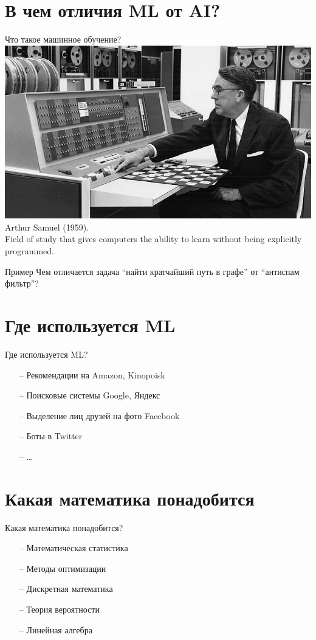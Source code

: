 \documentclass[10pt]{beamer}
\begin{document}
\section{В чем отличия ML от AI?}

\begin{frame}{Что такое машинное обучение?}
  \includegraphics[width=0.5 \linewidth, height=0.5 \textheight, keepaspectratio]{images/samuel}\\
	Arthur Samuel (1959). \\
	\bigbreak
	Field of study that gives computers the ability to learn without being explicitly programmed.
\end{frame}

\begin{frame}{Пример}
  Чем отличается задача “найти кратчайший путь в графе” от “антиспам фильтр”?
\end{frame}

\section{Где используется ML}

\begin{frame}{Где используется ML?}
	\begin{itemize}
	  \item[--] Рекомендации на Amazon, Kinopoisk
	  \item[--] Поисковые системы Google, Яндекс
	  \item[--] Выделение лиц друзей на фото Facebook
	  \item[--] Боты в Twitter
	  \item[--] \dots
	\end{itemize}
\end{frame}

\section{Какая математика понадобится}

\begin{frame}{Какая математика понадобится?}
	\begin{itemize}
	  \item[--] Математическая статистика 
	  \item[--] Методы оптимизации 
	  \item[--] Дискретная математика
	  \item[--] Теория вероятности
	  \item[--] Линейная алгебра
	\end{itemize}
\end{frame}
\end{document}
